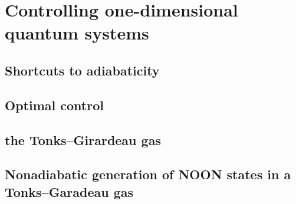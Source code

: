 \chapter{Controlling one-dimensional quantum systems}
\label{ch-1d}

\section{Shortcuts to adiabaticity}
\section{Optimal control}

\section{the Tonks--Girardeau gas}

\section{Nonadiabatic generation of NOON states in a Tonks--Garadeau gas}
